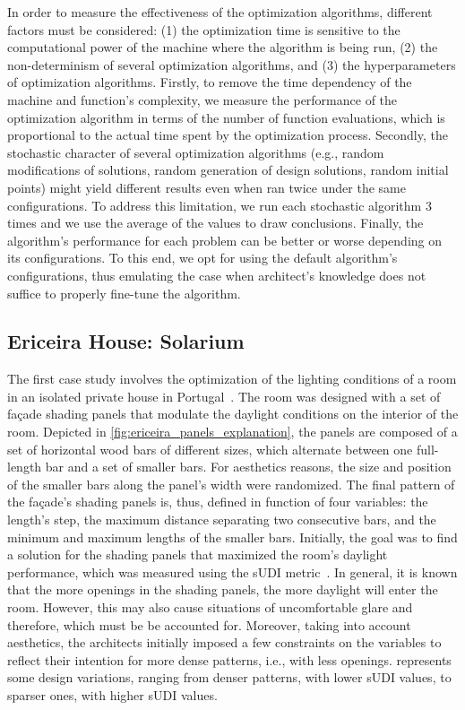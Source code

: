 In order to measure the effectiveness of the optimization algorithms, different factors must be considered: (1) the optimization time is sensitive to the computational power of the machine where the algorithm is being run, (2) the non-determinism of several optimization algorithms, and (3) the hyperparameters of optimization algorithms. Firstly, to remove the time dependency of the machine and function's complexity, we measure the performance of the optimization algorithm in terms of the number of function evaluations, which is proportional to the actual time spent by the optimization process. Secondly, the stochastic character of several optimization algorithms (e.g., random modifications of solutions, random generation of design solutions, random initial points) might yield different results even when ran twice under the same configurations. To address this limitation, we run each stochastic algorithm 3 times and we use the average of the values to draw conclusions. Finally, the algorithm's performance for each problem can be better or worse depending on its configurations. To this end, we opt for using the default algorithm's configurations, thus emulating the case when architect's knowledge does not suffice to properly fine-tune the algorithm.
 
\subsection{Ericeira House: Solarium}
The first case study involves the optimization of the lighting conditions of a room in an isolated private house in Portugal~\cite{Caetano2018,Belem2018optimizeddesign}. The room was designed with a set of façade shading panels that modulate the daylight conditions on the interior of the room. Depicted in \cref{fig:ericeira_panels_explanation}, the panels are composed of a set of horizontal wood bars of different sizes, which alternate between one full-length bar and a set of smaller bars. For aesthetics reasons, the size and position of the smaller bars along the panel's width were randomized. The final pattern of the façade's shading panels is, thus, defined in function of four variables: the length’s step, the maximum distance separating two consecutive bars, and the minimum and maximum lengths of the smaller bars. Initially, the goal was to find a solution for the shading panels that maximized the room's daylight performance, which was measured using the \ac{sUDI} metric~\cite{Nabil2006}. In general, it is known that the more openings in the shading panels, the more daylight will enter the room. However, this may also cause situations of uncomfortable glare and therefore, which must be be accounted for. Moreover, taking into account aesthetics, the architects initially imposed a few constraints on the variables to reflect their intention for more dense patterns, i.e., with less openings.  represents some design variations, ranging from denser patterns, with lower \ac{sUDI} values, to sparser ones, with higher \ac{sUDI} values.

